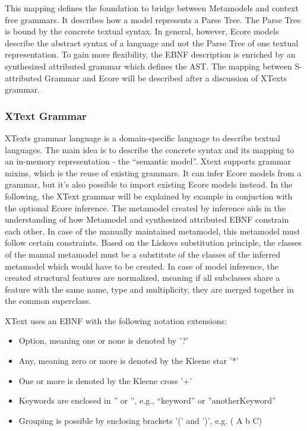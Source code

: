 This mapping defines the foundation to bridge between Metamodels and context free grammars. It describes how a model represents a Parse Tree. The Parse Tree is bound by the concrete textual syntax. In general, however, Ecore models describe the abstract syntax of a language and not the Parse Tree of one textual representation. To gain more flexibility, the EBNF description is enriched by an synthesized attributed grammar which defines the AST. The mapping between S-attributed Grammar and Ecore will be described after a discussion of XTexts grammar.


\subsubsection{XText Grammar}
XTexts grammar language is a domain-specific language to describe textual languages. The main idea is to describe the concrete syntax and its mapping to an in-memory representation - the ``semantic model''. Xtext supports grammar mixins, which is the reuse of existing grammars. It can infer Ecore models from a grammar, but it's also possible to import existing Ecore models instead. In the following, the XText grammar will be explained by example in conjuction with the optional Ecore inference. The metamodel created by inference aids in the understanding of how Metamodel and synthesized attributed EBNF constrain each other. In case of the manually maintained metamodel, this metamodel must follow certain constraints. Based on the Liskovs substitution principle, the classes of the manual metamodel must be a substitute of the classes of the inferred metamodel which would have to be created. In case of model inference, the created structural features are normalized, meaning if all subclasses share a feature with the same name, type and multiplicity, they are merged together in the common superclass.

XText uses an EBNF with the following notation extensions:
\begin{itemize}
	\item Option, meaning one or none is denoted by '?'
	\item Any, meaning zero or more is denoted by the Kleene star '*'
	\item One or more is denoted by the Kleene cross '+'
	\item Keywords are enclosed in '' or '', e.g., ``keyword'' or ''anotherKeyword''
	\item Grouping is possible by enclosing brackets '(' and  ')', e.g.  ( A b C)
\end{itemize}


